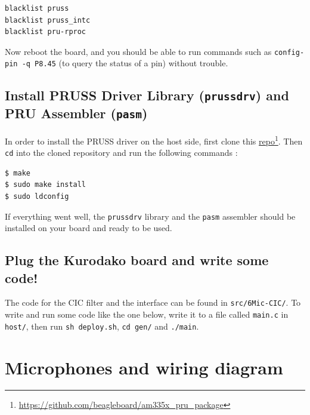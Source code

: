 \documentclass[]{report}
\begin{document}
\begin{verbatim}
blacklist pruss
blacklist pruss_intc
blacklist pru-rproc
\end{verbatim}

\noindent Now reboot the board, and you should be able to run commands such as
\texttt{config-pin\ -q\ P8.45} (to query the status of a pin) without trouble.

\hypertarget{install-pruss-driver-library-prussdrv-and-pru-assembler-pasm}{%
\subsection{\texorpdfstring{Install PRUSS Driver Library
(\texttt{prussdrv}) and PRU Assembler
(\texttt{pasm})}{Install PRUSS Driver Library (prussdrv) and PRU Assembler (pasm)}}\label{install-pruss-driver-library-prussdrv-and-pru-assembler-pasm}}

In order to install the PRUSS driver on the host side, first clone this
\href{https://github.com/beagleboard/am335x_pru_package}{repo}\footnote{\url{https://github.com/beagleboard/am335x_pru_package}}. Then
\texttt{cd} into the cloned repository and run the following commands :

\begin{verbatim}
$ make
$ sudo make install
$ sudo ldconfig
\end{verbatim}

If everything went well, the \texttt{prussdrv} library and the
\texttt{pasm} assembler should be installed on your board and ready to
be used.

\hypertarget{plug-the-octopus-board-and-write-some-code}{%
\subsection{Plug the Kurodako board and write some
code!}\label{plug-the-octopus-board-and-write-some-code}}

The code for the CIC filter and the interface can be found in
\texttt{src/6Mic-CIC/}. To write and run some code like the one below,
write it to a file called \texttt{main.c} in \texttt{host/}, then run
\texttt{sh\ deploy.sh}, \texttt{cd\ gen/} and \texttt{./main}.



\hypertarget{microphones-and-wiring-diagram}{%
\section{Microphones and wiring
diagram}\label{microphones-and-wiring-diagram}}
\end{document}
